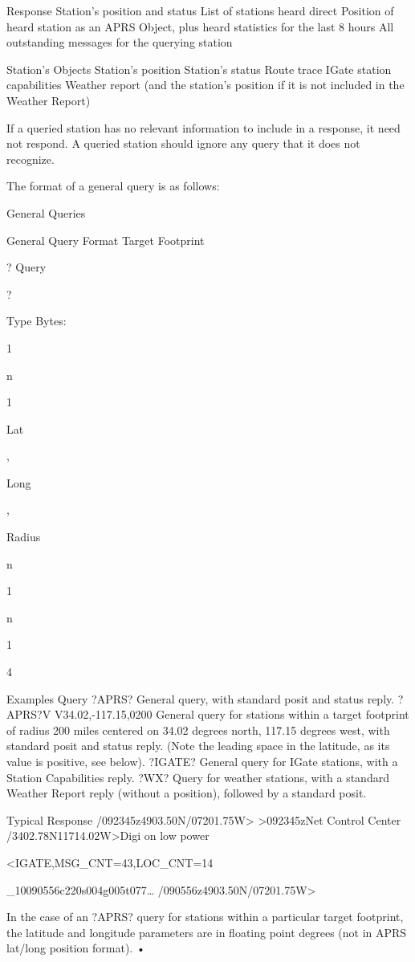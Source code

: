 Response
Station’s position and status
List of stations heard direct
Position of heard station as an APRS Object, plus
heard statistics for the last 8 hours
All outstanding messages for the querying station

Station’s Objects
Station’s position
Station’s status
Route trace
IGate station capabilities
Weather report (and the station’s position if it is
not included in the Weather Report)


If a queried station has no relevant information to include in a response, it
need not respond.
A queried station should ignore any query that it does not recognize.

The format of a general query is as follows:

General Queries

General Query Format
Target Footprint

? Query

?

Type
Bytes:

1

n

1

Lat

,

Long

,

Radius

n

1

n

1

4

Examples
Query
?APRS?
General query, with standard posit and status reply.
?APRS?V
V34.02,-117.15,0200
General query for stations within a target footprint
of radius 200 miles centered on 34.02 degrees
north, 117.15 degrees west, with standard posit
and status reply. (Note the leading space in the
latitude, as its value is positive, see below).
?IGATE?
General query for IGate stations, with a Station
Capabilities reply.
?WX?
Query for weather stations, with a standard
Weather Report reply (without a position),
followed by a standard posit.

Typical Response
/092345z4903.50N/07201.75W>
>092345zNet Control Center
/3402.78N11714.02W>Digi on low power

<IGATE,MSG_CNT=43,LOC_CNT=14

_10090556c220s004g005t077…
/090556z4903.50N/07201.75W>

In the case of an ?APRS? query for stations within a particular target
footprint, the latitude and longitude parameters are in floating point degrees
(not in APRS lat/long position format).
•

